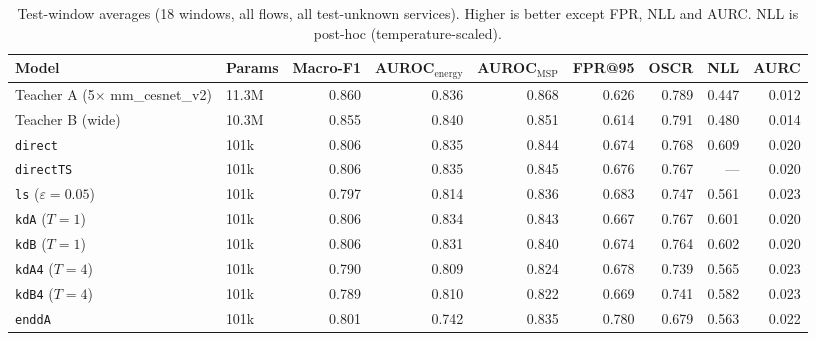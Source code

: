 \documentclass[journal]{IEEEtran}
\newcommand{\kd}[1]{\texttt{#1}}
\begin{document}
\begin{table}[t]
\centering
\caption{Test-window averages (18 windows, all flows, all test-unknown services). Higher is better except FPR, NLL and AURC. NLL is post-hoc (temperature-scaled).}
\label{tab:headline}
\begin{tabular}{llrrrrrrr}
\toprule
Model & Params & Macro-F1 & AUROC$_{\text{energy}}$ & AUROC$_{\text{MSP}}$ & FPR@95 & OSCR & NLL & AURC \\
\midrule
Teacher A (5$\times$ mm\_cesnet\_v2) & 11.3M & 0.860 & 0.836 & 0.868 & 0.626 & 0.789 & 0.447 & 0.012 \\
Teacher B (wide)                     & 10.3M & 0.855 & 0.840 & 0.851 & 0.614 & 0.791 & 0.480 & 0.014 \\
\midrule
\kd{direct}           & 101k & 0.806 & 0.835 & 0.844 & 0.674 & 0.768 & 0.609 & 0.020 \\
\kd{directTS}         & 101k & 0.806 & 0.835 & 0.845 & 0.676 & 0.767 & ---   & 0.020 \\
\kd{ls} ($\varepsilon=0.05$) & 101k & 0.797 & 0.814 & 0.836 & 0.683 & 0.747 & 0.561 & 0.023 \\
\kd{kdA} ($T=1$)      & 101k & 0.806 & 0.834 & 0.843 & 0.667 & 0.767 & 0.601 & 0.020 \\
\kd{kdB} ($T=1$)      & 101k & 0.806 & 0.831 & 0.840 & 0.674 & 0.764 & 0.602 & 0.020 \\
\kd{kdA4} ($T=4$)     & 101k & 0.790 & 0.809 & 0.824 & 0.678 & 0.739 & 0.565 & 0.023 \\
\kd{kdB4} ($T=4$)     & 101k & 0.789 & 0.810 & 0.822 & 0.669 & 0.741 & 0.582 & 0.023 \\
\kd{enddA}            & 101k & 0.801 & 0.742 & 0.835 & 0.780 & 0.679 & 0.563 & 0.022 \\
\bottomrule
\end{tabular}
\end{table}
\end{document}
